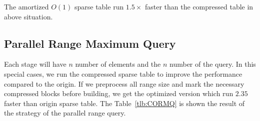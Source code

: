 The amortized $O(1)$ sparse table run $1.5 \times$ faster than the
compressed table in above situation.

\iffalse 當運行 $n > 10^6$ 時，我們提出的壓縮稀疏表的效能已經勝過并查
集的版本，其運行結果如圖表 ~\ref{fig:fig-ISMQcmp}。在 $n = 10^7$ 時，
加速 $1.25 \times$。然而，我們提供的 amortized $\theta(1)$ 的稀疏表慢
於并查集，我們做了深入的機率探討 (參照表 ~\ref{tlb:ISMQcmp})，由於大部
分的操作都被區塊後綴和前綴解決，沒有實際運用到內部詢問，約束區間詢問的
大小為 $L$，在 $N = 10^7$ 時，最多能加速 $1.26 \times$，其中插入和詢問
比例為 1:10，當詢問比重更大時，將有更明顯的加速。\fi



\subsection{Parallel Range Maximum Query}

Each stage will have $n$ number of elements and the $n$ number of the
query.  In this special cases, we run the compressed sparse table to
improve the performance compared to the origin.  If we preprocess all
range size and mark the necessary compressed blocks before building, we
get the optimized version which run $2.35$ faster than origin sparse
table. The Table~\ref{tlb:CORMQ} is shown the result of the strategy of
the parallel range query.

\iffalse 每一次有 $n$ 個元素和 $n$ 組詢問，針對這種特殊性質的問題，我
們運行樸素的 \texttt{CORMQ} (compressed RMQ) 得到效能改善，搭配可預測
的分析降低運算量 (參照 \texttt{CORMQ-opt})，得到更好的改善。在
\texttt{CORMQ-opt} 策略中，得到 $2.35 \times$ 倍的加速，結果如表
~\ref{tlb:CORMQ}。\fi


